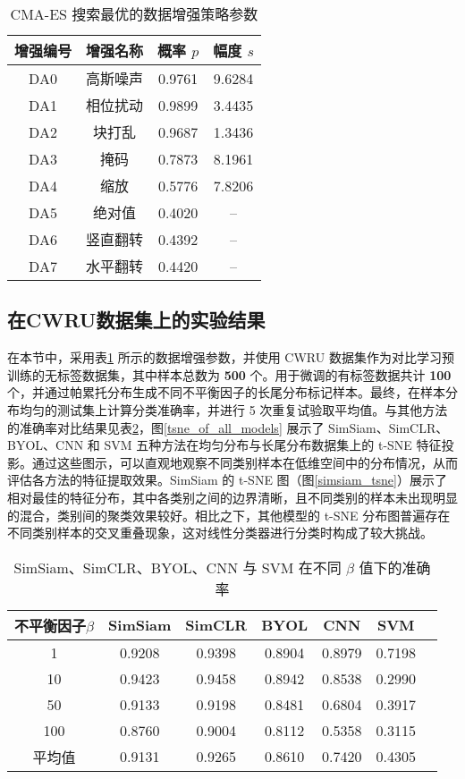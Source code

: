 \documentclass[master]{thesis-uestc}
\begin{document}
\begin{table}
    \caption{CMA-ES 搜索最优的数据增强策略参数}
    \centering
    \begin{tabular}{cccc}
    \toprule
    增强编号 & 增强名称 & 概率 $p$ & 幅度 $s$\\
    \midrule
    DA0 & 高斯噪声 & 0.9761 & 9.6284 \\
    DA1 & 相位扰动 & 0.9899 & 3.4435 \\
    DA2 & 块打乱 & 0.9687 & 1.3436 \\
    DA3 & 掩码 & 0.7873 & 8.1961 \\
    DA4 & 缩放 & 0.5776 & 7.8206 \\
    DA5 & 绝对值 & 0.4020 & -- \\
    DA6 & 竖直翻转 & 0.4392 & -- \\
    DA7 & 水平翻转 & 0.4420 & -- \\
    \bottomrule
    \end{tabular}
    \label{CMA-ES_solution}
\end{table}

\subsection{在CWRU数据集上的实验结果}
\label{simsiam_cwru_results}
在本节中，采用表\ref{CMA-ES_solution} 所示的数据增强参数，并使用 CWRU 数据集作为对比学习预训练的无标签数据集，其中样本总数为 \textbf{500} 个。用于微调的有标签数据共计 \textbf{100} 个，并通过帕累托分布生成不同不平衡因子的长尾分布标记样本。最终，在样本分布均匀的测试集上计算分类准确率，并进行 5 次重复试验取平均值。与其他方法的准确率对比结果见表\ref{simsiam_simclr_byol_cnn_svm_results}，图\ref{tsne_of_all_models} 展示了 SimSiam、SimCLR、BYOL、CNN 和 SVM 五种方法在均匀分布与长尾分布数据集上的 t-SNE 特征投影。通过这些图示，可以直观地观察不同类别样本在低维空间中的分布情况，从而评估各方法的特征提取效果。SimSiam 的 t-SNE 图（图\ref{simsiam_tsne}）展示了相对最佳的特征分布，其中各类别之间的边界清晰，且不同类别的样本未出现明显的混合，类别间的聚类效果较好。相比之下，其他模型的 t-SNE 分布图普遍存在不同类别样本的交叉重叠现象，这对线性分类器进行分类时构成了较大挑战。

\begin{table}
    \caption{SimSiam、SimCLR、BYOL、CNN 与 SVM 在不同 $\beta$ 值下的准确率}
    \centering
    \begin{tabular}{ccccccc}
    \toprule
    不平衡因子$\beta$  & SimSiam & SimCLR & BYOL & CNN & SVM \\
    \midrule
    1   & 0.9208  & 0.9398 & 0.8904 & 0.8979 & 0.7198 \\
    10  & 0.9423  & 0.9458 & 0.8942 & 0.8538 & 0.2990 \\
    50  & 0.9133  & 0.9198 & 0.8481 & 0.6804 & 0.3917 \\
    100 & 0.8760  & 0.9004 & 0.8112 & 0.5358 & 0.3115 \\
    \midrule
    平均值 & 0.9131 & 0.9265 & 0.8610 & 0.7420 & 0.4305 \\
    \bottomrule
    \end{tabular}
    \label{simsiam_simclr_byol_cnn_svm_results}
\end{table}
\end{document}
